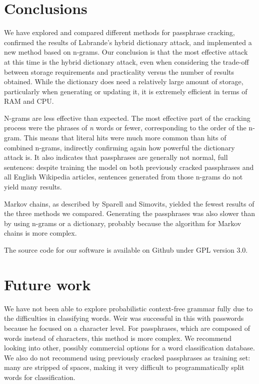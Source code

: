 \documentclass{article}
\begin{document}
\section{Conclusions}\label{sec:conclusions}

We have explored and compared different methods for passphrase cracking,
confirmed the results of Labrande's hybrid dictionary attack, and implemented a
new method based on n-grams. Our conclusion is that the most effective attack
at this time is the hybrid dictionary attack, even when considering the
trade-off between storage requirements and practicality versus the number of
results obtained. While the dictionary does need a relatively large amount of
storage, particularly when generating or updating it, it is extremely efficient
in terms of RAM and CPU.

N-grams are less effective than expected. The most effective part of the
cracking process were the phrases of {\it n} words or fewer, corresponding to
the order of the n-gram. This means that literal hits were much more common
than hits of combined n-grams, indirectly confirming again how powerful the
dictionary attack is. It also indicates that passphrases are generally not
normal, full sentences: despite training the model on both previously cracked
passphrases and all English Wikipedia articles, sentences generated from those
n-grams do not yield many results.

Markov chains, as described by Sparell and Simovits, yielded the fewest results
of the three methods we compared. Generating the passphrases was also slower
than by using n-grams or a dictionary, probably because the algorithm for
Markov chains is more complex.

The source code for our software is available on Github\cite{git} under GPL
version 3.0.


\section{Future work}\label{sec:futurework}

We have not been able to explore probabilistic context-free grammar fully due
to the difficulties in classifying words. Weir was successful in this with
passwords because he focused on a character level. For passphrases, which are
composed of words instead of characters, this method is more complex. We
recommend looking into other, possibly commercial options for a word
classification database. We also do not recommend using previously cracked
passphrases as training set: many are stripped of spaces, making it very
difficult to programmatically split words for classification.
\end{document}
